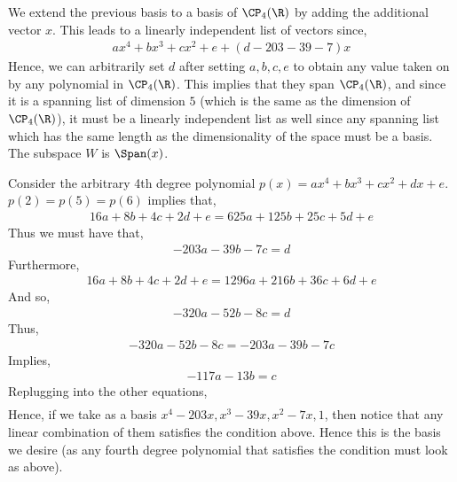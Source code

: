 \documentclass{book}
\begin{document}
\begin{enumerate}[label=\arabic*)]
\begin{enumerate}[label=\arabic*)]
      \ii
        We extend the previous basis to a basis of $\CP_4(\R)$ by adding the additional vector $x$. This leads to a linearly independent list of vectors since,
        \begin{align*}
          ax^4 + bx^3 + cx^2 + e + (d - 203 - 39 - 7)x
        \end{align*}
        Hence, we can arbitrarily set $d$ after setting $a, b, c, e$ to obtain any value taken on by any polynomial in $\CP_4(\R)$. This implies that they span $\CP_4(\R)$,
        and since it is a spanning list of dimension $5$ (which is the same as the dimension of $\CP_4(\R)$), it must be a linearly independent list as well since any spanning
        list which has the same length as the dimensionality of the space must be a basis.
      \ii
        The subspace $W$ is $\Span(x)$.
    \end{enumerate}
    \ii
    \begin{enumerate}[label=\arabic*)]
      \ii 
        Consider the arbitrary 4th degree polynomial $p(x) = ax^4 + bx^3 + cx^2 + dx + e$. $p(2) = p(5) = p(6)$ implies that,
        \begin{align*}
          16a + 8b + 4c + 2d + e = 625a + 125b + 25c + 5d + e
        \end{align*}
        Thus we must have that,
        \begin{align*}
          -203a - 39b - 7c = d
        \end{align*}
        Furthermore,
        \begin{align*}
          16a + 8b + 4c + 2d + e = 1296a + 216b + 36c + 6d + e
        \end{align*}
        And so,
        \begin{align*}
          -320a - 52b - 8c = d
        \end{align*}
        Thus,
        \begin{align*}
          -320a - 52b - 8c =  -203a - 39b - 7c 
        \end{align*}
        Implies,
        \begin{align*}
          -117a - 13b = c
        \end{align*}
        Replugging into the other equations,
        \begin{align*}
        \end{align*}
        Hence, if we take as a basis $x^4 - 203x, x^3 - 39x, x^2 - 7x, 1$, then notice that any linear combination of them satisfies the condition above. Hence this is the basis
        we desire (as any fourth degree polynomial that satisfies the condition must look as above).

\end{enumerate}
\end{enumerate}
\end{document}
